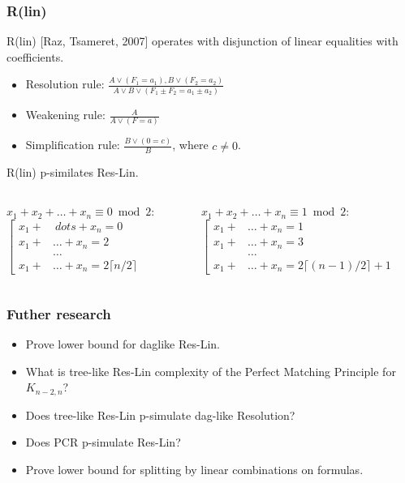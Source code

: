 \begin{frame}
    \frametitle{R(lin)}

    R(lin) [Raz, Tsameret, 2007] operates with disjunction of linear equalities with
     coefficients.
    
	\begin{itemize}
		\item Resolution rule: $\frac{A \lor (F_1 = a_1), B \lor (F_2 = a_2)}
    		{A \lor B \lor (F_1 \pm F_2 = a_1 \pm a_2)}$
		\item Weakening rule: $\frac{A}{A \lor (F = a)}$
		\item Simplification rule: $\frac{B \lor (0 = c)}{B}$, where $c \neq 0$. 
	\end{itemize}

	\pause
    \begin{theorem}
    	R(lin) p-similates Res-Lin.    
    \end{theorem}
    
	\medskip

	\pause
	\begin{columns}
		\begin{column}{5cm}
			$x_1 + x_2 + \dots + x_n \equiv 0 \bmod 2$:
			$\left[\begin{aligned}
            	x_1 + &\ dots + x_n = 0\\
                x_1 + &\dots + x_n = 2\\
                &\dots \\
                x_1 + &\dots + x_n = 2 \lceil n / 2 \rceil
            \end{aligned}\right.$ 
		\end{column}
		\begin{column}{5cm}
			$x_1 + x_2 + \dots + x_n \equiv 1 \bmod 2$:
			$\left[\begin{aligned}
                x_1 + &\dots + x_n = 1\\
                x_1 + &\dots + x_n = 3\\
                &\dots \\
                x_1 + &\dots + x_n = 2 \lceil (n - 1) / 2 \rceil + 1
            \end{aligned}\right.$
		\end{column}
	\end{columns}
\end{frame}


\begin{frame}
    \frametitle{Futher research}

    \begin{itemize}
		\item Prove lower bound for daglike Res-Lin.
		\item What is tree-like Res-Lin complexity of the Perfect Matching Principle
		    for $K_{n - 2, n}$? 
		\item Does tree-like Res-Lin p-simulate dag-like Resolution?
		\item Does PCR p-simulate Res-Lin?
		\item Prove lower bound for splitting by linear combinations on
		     formulas.
	\end{itemize}
\end{frame}


